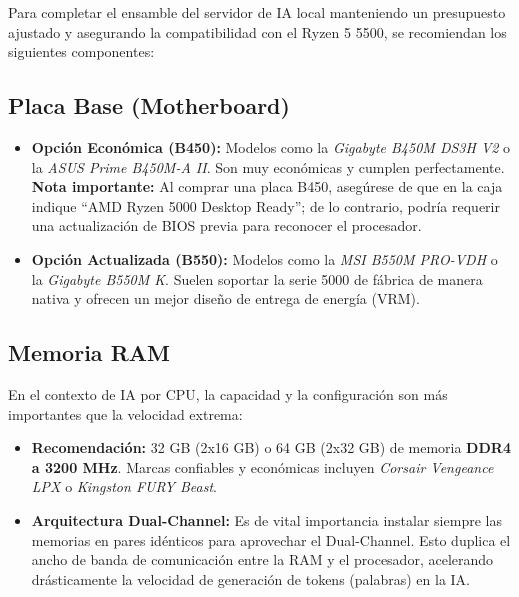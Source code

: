 \documentclass[11pt,a4paper]{article}
\begin{document}
Para completar el ensamble del servidor de IA local manteniendo un presupuesto ajustado y asegurando la compatibilidad con el Ryzen 5 5500, se recomiendan los siguientes componentes:

\subsection{Placa Base (Motherboard)}

\begin{tcolorbox}[cajaRecomendacion, title={\faIcon{memory}~Placa Base}]
\begin{itemize}
    \item \textbf{Opción Económica (B450):} Modelos como la \textit{Gigabyte B450M DS3H V2} o la \textit{ASUS Prime B450M-A II}. Son muy económicas y cumplen perfectamente. \textbf{Nota importante:} Al comprar una placa B450, asegúrese de que en la caja indique ``AMD Ryzen 5000 Desktop Ready''; de lo contrario, podría requerir una actualización de BIOS previa para reconocer el procesador.
    \item \textbf{Opción Actualizada (B550):} Modelos como la \textit{MSI B550M PRO-VDH} o la \textit{Gigabyte B550M K}. Suelen soportar la serie 5000 de fábrica de manera nativa y ofrecen un mejor diseño de entrega de energía (VRM).
\end{itemize}
\end{tcolorbox}

\subsection{Memoria RAM}

En el contexto de IA por CPU, la capacidad y la configuración son más importantes que la velocidad extrema:

\begin{tcolorbox}[cajaRecomendacion, title={\faIcon{memory}~Memoria RAM}]
\begin{itemize}
    \item \textbf{Recomendación:} 32 GB (2x16 GB) o 64 GB (2x32 GB) de memoria \textbf{DDR4 a 3200 MHz}. Marcas confiables y económicas incluyen \textit{Corsair Vengeance LPX} o \textit{Kingston FURY Beast}.
    \item \textbf{Arquitectura Dual-Channel:} Es de vital importancia instalar siempre las memorias en pares idénticos para aprovechar el Dual-Channel. Esto duplica el ancho de banda de comunicación entre la RAM y el procesador, acelerando drásticamente la velocidad de generación de tokens (palabras) en la IA.
\end{itemize}
\end{tcolorbox}
\end{document}
